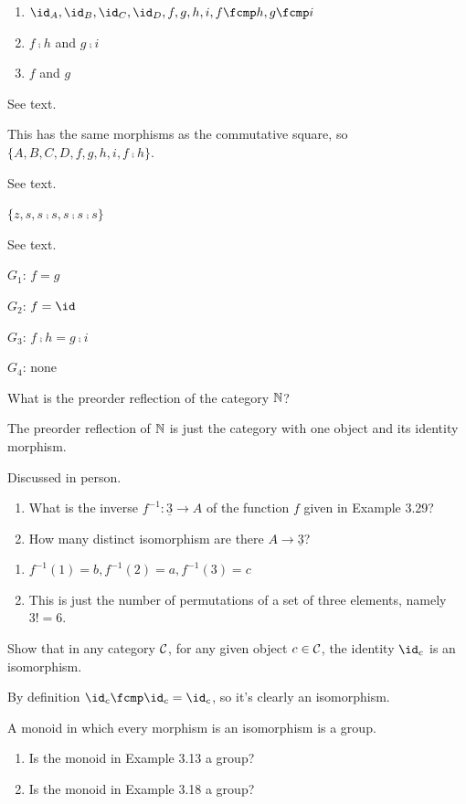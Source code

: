 \solution
\begin{enumerate}
	\item $\id_A, \id_B, \id_C, \id_D, f, g, h, i, f\fcmp h, g\fcmp i$
	\item $f\fcmp h$ and $g\fcmp i$
	\item $f$ and $g$
\end{enumerate}

See text.

\solution
This has the same morphisms as the commutative square, so $\{A, B, C, D, f ,g, h, i, f\fcmp h\}$.

See text.

\solution
$\{z, s, s\fcmp s, s\fcmp s\fcmp s\}$

See text.

\solution
$G_1$: $f=g$

$G_2$: $f=\id$

$G_3$: $f\fcmp h=g\fcmp i$

$G_4$: none

What is the preorder reflection of the category $\mathbb{N}$?

\solution
The preorder reflection of $\mathbb{N}$ is just the category with one object and its identity morphism.

Discussed in person.

\begin{enumerate}
	\item What is the inverse $f^{-1}:\underline{3}\to A$ of the function $f$ given in Example 3.29?
	\item How many distinct isomorphism are there $A\to\underline{3}$?
\end{enumerate}

\solution
\begin{enumerate}
	\item $f^{-1}(1) = b, f^{-1}(2)=a, f^{-1}(3)=c$
	\item This is just the number of permutations of a set of three elements, namely $3!=6$.
\end{enumerate}

Show that in any category $\mathcal{C}$, for any given object $c\in\mathcal{C}$, the identity $\id_c$ is an isomorphism.

\solution
By definition $\id_c\fcmp\id_c=\id_c$, so it's clearly an isomorphism.

A monoid in which every morphism is an isomorphism is a group.
\begin{enumerate}
	\item Is the monoid in Example 3.13 a group?
	\item Is the monoid in Example 3.18 a group?
\end{enumerate}

